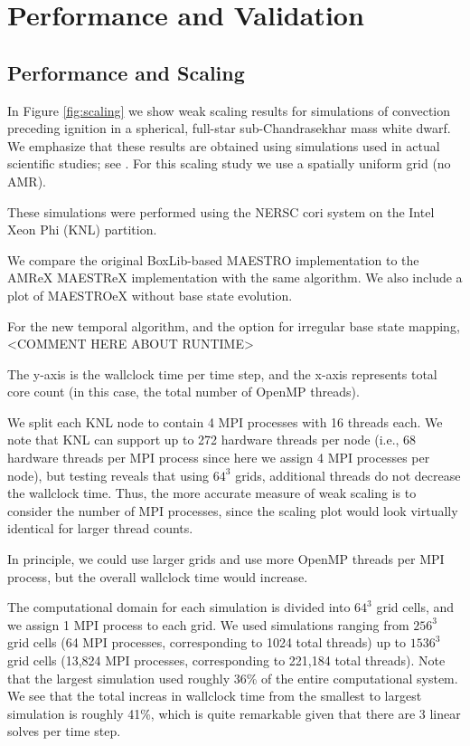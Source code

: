 \section{Performance and Validation}

\subsection{Performance and Scaling}
In Figure \ref{fig:scaling} we show weak scaling results for simulations of convection preceding ignition in a spherical, full-star sub-Chandrasekhar mass white dwarf.
We emphasize that these results are obtained using simulations used in actual scientific studies; see \cite{MAESTRO_convection,MAESTRO_AMR}.
For this scaling study we use a spatially uniform grid (no AMR).


These simulations were performed using the NERSC cori system on the Intel Xeon Phi (KNL) partition.

We compare the original BoxLib-based MAESTRO implementation to the AMReX MAESTReX implementation with the same algorithm.
We also include a plot of MAESTROeX without base state evolution.

For the new temporal algorithm, and the option for irregular base state mapping, <COMMENT HERE ABOUT RUNTIME>



The y-axis is the wallclock time per time step, and the x-axis represents total core count (in this case, the total number of OpenMP threads).

We split each KNL node to contain 4 MPI processes with 16 threads each.  We note that KNL can support up to 272 hardware threads per node (i.e., 68 hardware threads per MPI process since here we assign 4 MPI processes per node), but testing reveals that using $64^3$ grids, additional threads do not decrease the wallclock time.  Thus, the more accurate measure of weak scaling is to consider the number of MPI processes, since the scaling plot would look virtually identical for larger thread counts.


In principle, we could use larger grids and use more OpenMP threads per MPI process, but the overall wallclock time would increase.

The computational domain for each simulation is divided into $64^3$ grid cells, and we assign 1 MPI process to each grid.
We used simulations ranging from $256^3$ grid cells (64 MPI processes, corresponding to 1024 total threads) up to $1536^3$ grid cells (13,824 MPI processes, corresponding to 221,184 total threads).
Note that the largest simulation used roughly 36\% of the entire computational system.
We see that the total increas in wallclock time from the smallest to largest simulation is roughly 41\%, which is quite remarkable given that there are 3 linear solves per time step.

